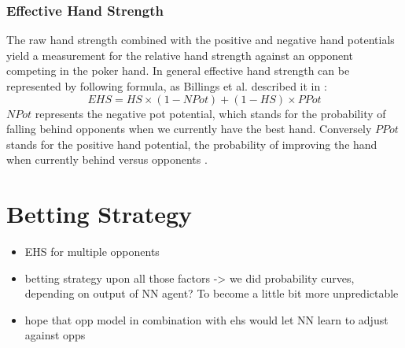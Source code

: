 \subsubsection{Effective Hand Strength}
The raw hand strength combined with the positive and negative hand potentials yield a measurement for the relative hand strength against an opponent competing in the poker hand. In general effective hand strength can be represented by following formula, as Billings et al. described it in \cite[p. 41]{opp_master}:
\begin{equation}
\label{eq:ehs}
EHS = HS \times (1 - NPot) + (1-HS) \times PPot
\end{equation}
$NPot$ represents the negative pot potential, which stands for the probability of falling behind opponents when we currently have the best hand. Conversely $PPot$ stands for the positive hand potential, the probability of improving the hand when currently behind versus opponents \cite{opp_modeling}.
\pagebreak
\section{Betting Strategy}
\begin{itemize}
\item EHS for multiple opponents
\item betting strategy upon all those factors -> we did probability curves, depending on output of NN agent? To become a little bit more unpredictable
\item hope that opp model in combination with ehs would let NN learn to adjust against opps 
\end{itemize}

